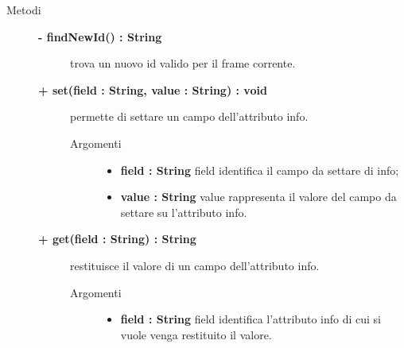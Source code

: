 \begin{description}
\item[Metodi] \hfill

	\begin{description}
		\item[\textbf{\color{blue}- findNewId() : String			}] \hfill
			trova un nuovo id valido per il frame corrente.

\end{description}

	\begin{description}
		\item[\textbf{\color{blue}+ set(field : String, value : String) : void			}] \hfill
			permette di settare un campo dell'attributo info.
			
		\begin{description}
			\item[Argomenti] \hfill
				\begin{itemize}
				
					\item \textbf{field : String			} \hfill
					field identifica il campo da settare di info;
					\item \textbf{value : String			} \hfill
					value rappresenta il valore del campo da settare su l'attributo info.
				\end{itemize}
		\end{description}

\end{description}

\begin{description}
		\item[\textbf{\color{blue}+ get(field : String) : String			}] \hfill
			restituisce il valore di un campo dell'attributo info.
			
		\begin{description}
			\item[Argomenti] \hfill
				\begin{itemize}
				
					\item \textbf{field : String			} \hfill
					field identifica l'attributo info di cui si vuole venga restituito il valore.
				\end{itemize}
		\end{description}

\end{description}


\end{description}
